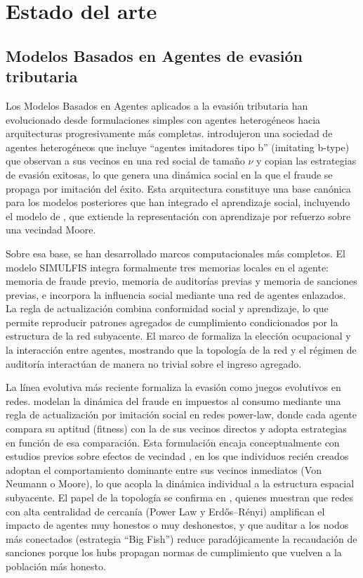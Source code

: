 \chapter{Estado del arte} %
\label{sec:EstadoArte} %
\section{Modelos Basados en Agentes de evasión tributaria}
\label{sec:edo-ABM}

Los Modelos Basados en Agentes aplicados a la evasión tributaria han evolucionado desde formulaciones simples con agentes heterogéneos hacia arquitecturas progresivamente más completas. \textcite{hokamp2010income} introdujeron una sociedad de agentes heterogéneos que incluye ``agentes imitadores tipo b'' (imitating b-type) que observan a sus vecinos en una red social de tamaño $\nu$ y copian las estrategias de evasión exitosas, lo que genera una dinámica social en la que el fraude se propaga por imitación del éxito. Esta arquitectura constituye una base canónica para los modelos posteriores que han integrado el aprendizaje social, incluyendo el modelo de \textcite{canessa2025tax}, que extiende la representación con aprendizaje por refuerzo sobre una vecindad Moore.

Sobre esa base, se han desarrollado marcos computacionales más completos. El modelo SIMULFIS \parencite{llacer2018simulfis, noguera2014tax} integra formalmente tres memorias locales en el agente: memoria de fraude previo, memoria de auditorías previas y memoria de sanciones previas, e incorpora la influencia social mediante una red de agentes enlazados. La regla de actualización combina conformidad social y aprendizaje, lo que permite reproducir patrones agregados de cumplimiento condicionados por la estructura de la red subyacente. El marco de \textcite{hashimzade2014agent} formaliza la elección ocupacional y la interacción entre agentes, mostrando que la topología de la red y el régimen de auditoría interactúan de manera no trivial sobre el ingreso agregado.

La línea evolutiva más reciente formaliza la evasión como juegos evolutivos en redes. \textcite{chica2021evolutionary} modelan la dinámica del fraude en impuestos al consumo mediante una regla de actualización por imitación social en redes power-law, donde cada agente compara su aptitud (fitness) con la de sus vecinos directos y adopta estrategias en función de esa comparación. Esta formulación encaja conceptualmente con estudios previos sobre efectos de vecindad \parencite{arslan2013effects}, en los que individuos recién creados adoptan el comportamiento dominante entre sus vecinos inmediatos (Von Neumann o Moore), lo que acopla la dinámica individual a la estructura espacial subyacente. El papel de la topología se confirma en \textcite{andrei2014agent}, quienes muestran que redes con alta centralidad de cercanía (Power Law y Erdős--Rényi) amplifican el impacto de agentes muy honestos o muy deshonestos, y que auditar a los nodos más conectados (estrategia ``Big Fish'') reduce paradójicamente la recaudación de sanciones porque los hubs propagan normas de cumplimiento que vuelven a la población más honesto.

